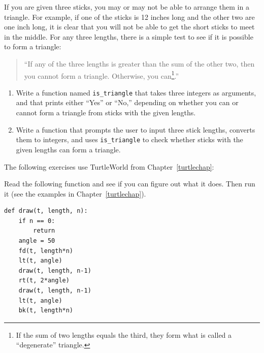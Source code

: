 \documentclass[10pt]{book}
\begin{document}
\begin{ex}

If you are given three sticks, you may or may not be able to arrange
them in a triangle.  For example, if one of the sticks is 12 inches
long and the other two are one inch long, it is clear that you will
not be able to get the short sticks to meet in the middle.  For any
three lengths, there is a simple test to see if it is possible to form
a triangle:

\begin{quotation}
``If any of the three lengths is greater than the sum of the other
  two, then you cannot form a triangle.  Otherwise, you
  can\footnote{If the sum of two lengths equals the third, they form
    what is called a ``degenerate'' triangle.}.''
\end{quotation}

\begin{enumerate}

\item Write a function named \verb"is_triangle" that takes three
  integers as arguments, and that prints either ``Yes'' or ``No,'' depending
  on whether you can or cannot form a triangle from sticks with the
  given lengths.

\item Write a function that prompts the user to input three stick
  lengths, converts them to integers, and uses \verb"is_triangle" to
  check whether sticks with the given lengths can form a triangle.

\end{enumerate}

\end{ex}

The following exercises use TurtleWorld from Chapter~\ref{turtlechap}:


\begin{ex}

Read the following function and see if you can figure out
what it does.  Then run it (see the examples in Chapter~\ref{turtlechap}).

\beforeverb
\begin{verbatim}
def draw(t, length, n):
    if n == 0:
        return
    angle = 50
    fd(t, length*n)
    lt(t, angle)
    draw(t, length, n-1)
    rt(t, 2*angle)
    draw(t, length, n-1)
    lt(t, angle)
    bk(t, length*n)
\end{verbatim}
\afterverb

\end{ex}
\end{document}
